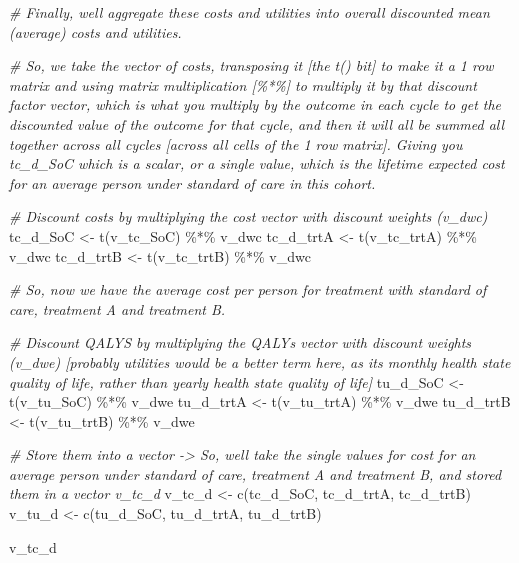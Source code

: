 \documentclass[
]{article}
\newenvironment{Shaded}{\begin{snugshade}}{\end{snugshade}}
\newcommand{\CommentTok}[1]{\textcolor[rgb]{0.56,0.35,0.01}{\textit{#1}}}
\newcommand{\FunctionTok}[1]{\textcolor[rgb]{0.00,0.00,0.00}{#1}}
\newcommand{\NormalTok}[1]{#1}
\newcommand{\OtherTok}[1]{\textcolor[rgb]{0.56,0.35,0.01}{#1}}
\newcommand{\SpecialCharTok}[1]{\textcolor[rgb]{0.00,0.00,0.00}{#1}}
\begin{document}
\begin{Shaded}
\begin{Highlighting}[]
\CommentTok{\# Finally, we\textquotesingle{}ll aggregate these costs and utilities into overall discounted mean (average) costs and utilities.}

\CommentTok{\# So, we take the vector of costs, transposing it [the t() bit] to make it a 1 row matrix and using matrix multiplication [\%*\%] to multiply it by that discount factor vector, which is what you multiply by the outcome in each cycle to get the discounted value of the outcome for that cycle, and then it will all be summed all together across all cycles [across all cells of the 1 row matrix]. Giving you tc\_d\_SoC which is a scalar, or a single value, which is the lifetime expected cost for an average person under standard of care in this cohort. }


\CommentTok{\# Discount costs by multiplying the cost vector with discount weights (v\_dwc) }
\NormalTok{tc\_d\_SoC  }\OtherTok{\textless{}{-}}  \FunctionTok{t}\NormalTok{(v\_tc\_SoC)  }\SpecialCharTok{\%*\%}\NormalTok{ v\_dwc}
\NormalTok{tc\_d\_trtA }\OtherTok{\textless{}{-}}  \FunctionTok{t}\NormalTok{(v\_tc\_trtA) }\SpecialCharTok{\%*\%}\NormalTok{ v\_dwc}
\NormalTok{tc\_d\_trtB }\OtherTok{\textless{}{-}}  \FunctionTok{t}\NormalTok{(v\_tc\_trtB) }\SpecialCharTok{\%*\%}\NormalTok{ v\_dwc}


\CommentTok{\# So, now we have the average cost per person for treatment with standard of care, treatment A and treatment B. }


\CommentTok{\# Discount QALYS by multiplying the QALYs vector with discount weights (v\_dwe) [probably utilities would be a better term here, as it\textquotesingle{}s monthly health state quality of life, rather than yearly health state quality of life]}
\NormalTok{tu\_d\_SoC  }\OtherTok{\textless{}{-}}  \FunctionTok{t}\NormalTok{(v\_tu\_SoC)  }\SpecialCharTok{\%*\%}\NormalTok{ v\_dwe}
\NormalTok{tu\_d\_trtA }\OtherTok{\textless{}{-}}  \FunctionTok{t}\NormalTok{(v\_tu\_trtA) }\SpecialCharTok{\%*\%}\NormalTok{ v\_dwe}
\NormalTok{tu\_d\_trtB }\OtherTok{\textless{}{-}}  \FunctionTok{t}\NormalTok{(v\_tu\_trtB) }\SpecialCharTok{\%*\%}\NormalTok{ v\_dwe}

\CommentTok{\# Store them into a vector {-}\textgreater{} So, we\textquotesingle{}ll take the single values for cost for an average person under standard of care, treatment A and treatment B, and stored them in a vector v\_tc\_d}
\NormalTok{v\_tc\_d }\OtherTok{\textless{}{-}} \FunctionTok{c}\NormalTok{(tc\_d\_SoC, tc\_d\_trtA, tc\_d\_trtB)}
\NormalTok{v\_tu\_d }\OtherTok{\textless{}{-}} \FunctionTok{c}\NormalTok{(tu\_d\_SoC, tu\_d\_trtA, tu\_d\_trtB)}

\NormalTok{v\_tc\_d}
\end{Highlighting}
\end{Shaded}
\end{document}
